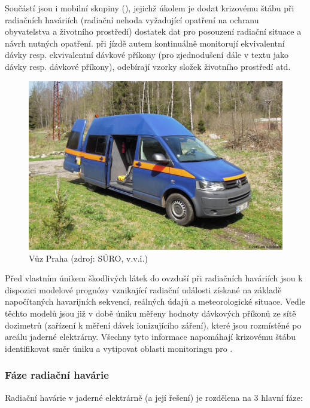 Součástí  jsou i mobilní skupiny (), jejichž úkolem je dodat krizovému štábu při radiačních haváriích (radiační nehoda vyžadující opatření na ochranu obyvatelstva a životního prostředí) dostatek dat pro posouzení radiační situace a návrh nutných opatření.  při jízdě autem kontinuálně monitorují ekvivalentní dávky resp. ekvivalentní dávkové příkony (pro zjednodušení dále v textu jako dávky resp. dávkové příkony), odebírají vzorky složek životního prostředí atd.  \cite{metodika} \cite{pecha2011monitorovani}

\begin{figure}[H]
    \centering
    \includegraphics[scale=0.6]{./pictures/vuzSURO.jpg}
      	\caption[Vůz   Praha]{Vůz   Praha (zdroj: SÚRO, v.v.i.)}
    	\label{fig:vuzSURO}
\end{figure} 

Před vlastním únikem škodlivých látek do ovzduší při radiačních haváriích jsou k dispozici modelové prognózy vznikající radiační události získané na základě napočítaných havarijních sekvencí, reálných údajů a meteorologické situace. Vedle těchto modelů jsou již v době úniku měřeny hodnoty dávkových příkonů ze sítě dozimetrů (zařízení k měření dávek ionizujícího záření), které jsou rozmístěné po areálu jaderné elektrárny. Všechny tyto informace napomáhají krizovému štábu identifikovat směr úniku a vytipovat oblasti monitoringu pro . 

\subsubsection{Fáze radiační havárie}

Radiační havárie v jaderné elektrárně (a její řešení) je rozdělena na 3 hlavní fáze:

